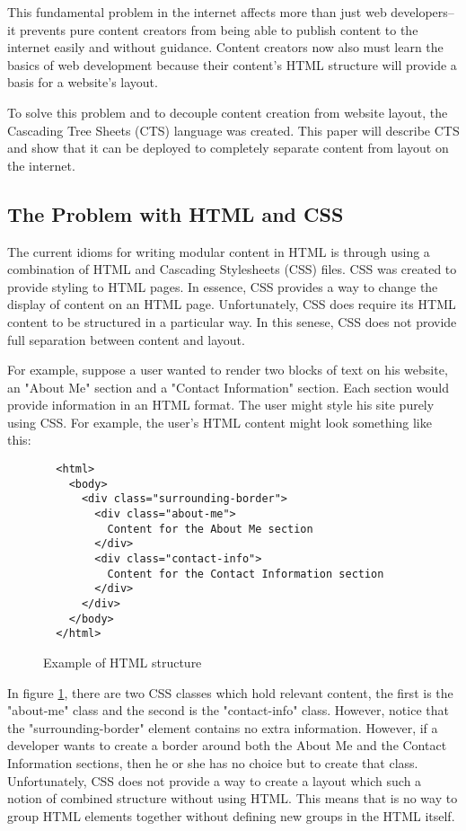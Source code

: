 \documentclass[12pt]{article}
\begin{document}
This fundamental problem in the internet affects more than just web developers--it prevents pure content creators from being able to publish content to the internet easily and without guidance. Content creators now also must learn the basics of web development because their content's HTML structure will provide a basis for a website's layout.

To solve this problem and to decouple content creation from website layout, the Cascading Tree Sheets (CTS) language was created. This paper will describe CTS and show that it can be deployed to completely separate content from layout on the internet.

\subsection{The Problem with HTML and CSS}

The current idioms for writing modular content in HTML is through using a combination of HTML and Cascading Stylesheets (CSS) files. CSS was created to provide styling to HTML pages. In essence, CSS provides a way to change the display of content on an HTML page. Unfortunately, CSS does require its HTML content to be structured in a particular way. In this senese, CSS does not provide full separation between content and layout.

For example, suppose a user wanted to render two blocks of text on his website, an "About Me" section and a "Contact Information" section. Each section would provide information in an HTML format. The user might style his site purely using CSS. For example, the user's HTML content might look something like this:

\begin{figure}
  \begin{lstlisting}
  <html>
    <body>
      <div class="surrounding-border">
        <div class="about-me">
          Content for the About Me section
        </div>
        <div class="contact-info">
          Content for the Contact Information section
        </div>
      </div>
    </body>
  </html>
  \end{lstlisting}
  \caption{\label{fig:html-example}Example of HTML structure}
\end{figure}

In figure \ref{fig:html-example}, there are two CSS classes which hold relevant content, the first is the "about-me" class and the second is the "contact-info" class. However, notice that the "surrounding-border" element contains no extra information. However, if a developer wants to create a border around both the About Me and the Contact Information sections, then he or she has no choice but to create that class. Unfortunately, CSS does not provide a way to create a layout which such a notion of combined structure without using HTML. This means that is no way to group HTML elements together without defining new groups in the HTML itself. 
\end{document}
